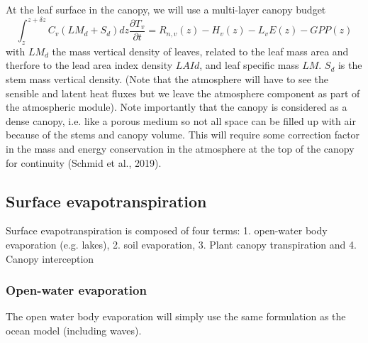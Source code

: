 \documentclass{article}
\begin{document}
At the leaf surface in the canopy, we will use a multi-layer canopy budget
\begin{equation}
    \int_z^{z+\delta z}{C_v (LM_d+S_d) dz\frac{\partial T_v}{\partial t}} = R_{n,v}(z) -H_v(z)-L_vE(z)-GPP(z)
\end{equation}
with $LM_d$ the mass vertical density of leaves, related to the leaf mass area and therfore to the lead area index density $LAId$, and leaf specific mass $LM$. $S_d$ is the stem mass vertical density.
(Note that the atmosphere will have to see the sensible and latent heat fluxes but we leave the atmosphere component as part of the atmospheric module). Note importantly that the canopy is considered as a dense canopy, i.e. like a porous medium so not all space can be filled up with air because of the stems and canopy volume. This will require some correction factor in the mass and energy conservation in the atmosphere at the top of the canopy for continuity (Schmid et al., 2019).

\subsection{Surface evapotranspiration}
Surface evapotranspiration is composed of four terms: 1. open-water body evaporation (e.g. lakes), 2. soil evaporation, 3. Plant canopy transpiration and 4. Canopy interception
\subsubsection{Open-water evaporation}
The open water body evaporation will simply use the same formulation as the ocean model (including waves).
\end{document}
